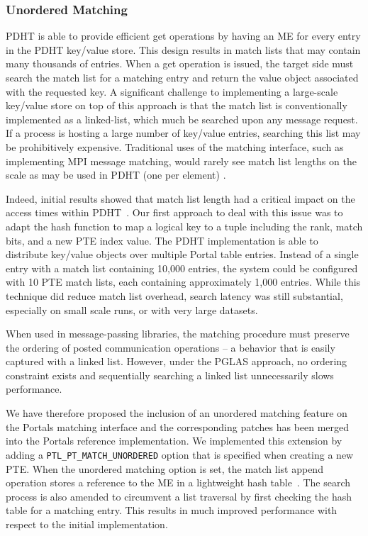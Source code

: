 \subsubsection{Unordered Matching}

PDHT is able to provide efficient get
operations by having an ME for every entry in the PDHT key/value store. This
design results in match lists that may contain many thousands of entries. When
a get operation is issued, the target side must search the match list for a
matching entry and return the value object associated with the requested key. A
significant challenge to implementing a large-scale key/value store on top of
this approach is that the match list is conventionally implemented as a
linked-list, which much be searched upon any message request. If a process is
hosting a large number of key/value entries, searching this list may be
prohibitively expensive. Traditional uses of the matching interface, such as
implementing MPI message matching, would rarely see match list lengths on the
scale as may be used in PDHT (one per element) \cite{flajslik:16}.

Indeed, initial results showed that match list length had a critical impact on
the access times within PDHT~\cite{comhpc16}. Our first approach to deal with
this issue was to adapt the hash function to map a logical key to a tuple
including the rank, match bits, and a new PTE index value. The PDHT
implementation is able to distribute key/value objects over multiple Portal
table entries. Instead of a single entry with a match list containing 10,000
entries, the system could be configured with 10 PTE match lists, each
containing approximately 1,000 entries. While this technique did reduce match
list overhead, search latency was still substantial, especially on small scale
runs, or with very large datasets.

When used in message-passing libraries, the matching procedure must preserve
the ordering of posted communication operations -- a behavior that is easily
captured with a linked list. However, under the PGLAS approach, no ordering
constraint exists and sequentially searching a linked list unnecessarily slows
performance.

\sloppypar
We have therefore proposed the inclusion of an unordered matching feature on the Portals matching interface
and the corresponding patches has been merged into the Portals reference implementation.
We implemented this extension by adding a {\tt PTL\_PT\_MATCH\_UNORDERED} option that is
specified when creating a new PTE. When the unordered matching option is set,
the match list append operation stores a reference to the ME in a lightweight
hash table~\cite{uthash}.  The search process is also amended to circumvent a
list traversal by first checking the hash table for a matching entry. This
results in much improved performance with respect to the initial
implementation.

